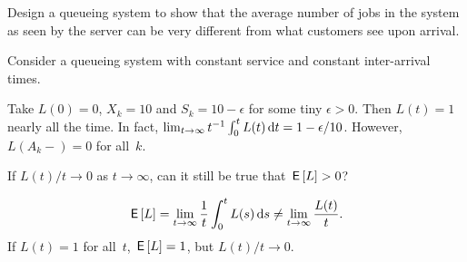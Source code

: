 \documentclass[stochastic-or.tex]{subfiles}
\begin{document}
\begin{exercise}\label{ex:l-165}
Design a queueing system to show that the average number of jobs in the system as seen by the server can be very different from what customers see upon arrival.
\begin{hint}
Consider a queueing system with constant service and constant inter-arrival times.
\end{hint}
\begin{solution}
 Take $L(0) = 0$, $X_k = 10$ and $S_k = 10-\epsilon$ for some tiny
 $\epsilon>0$. Then $L(t) = 1$ nearly all the time. In fact,
 $\lim_{t\to\infty}t^{-1}\int_0^t L(t) \,\textrm{d}t= 1-\epsilon/10$. However, $L(A_k-)=0$ for all~$k$.
\end{solution}
\end{exercise}


\begin{exercise}\label{ex:90}
 If $L(t)/t \to 0$ as $t\to\infty$, can it still be true that $\,\mathsf{E}\left[L\right]>0$?
\begin{solution}
 \begin{equation*}
 \,\mathsf{E}\left[L\right] = \lim_{t\to\infty} \frac 1 t \int_0^t L(s) \,\textrm{d}s \neq \lim_{t\to\infty} \frac{L(t)}t.
 \end{equation*}
If $L(t)=1$ for all~$t$, $\,\mathsf{E}\left[L\right] =1 $, but $L(t)/t \to 0$.
\end{solution}
\end{exercise}




\end{document}
